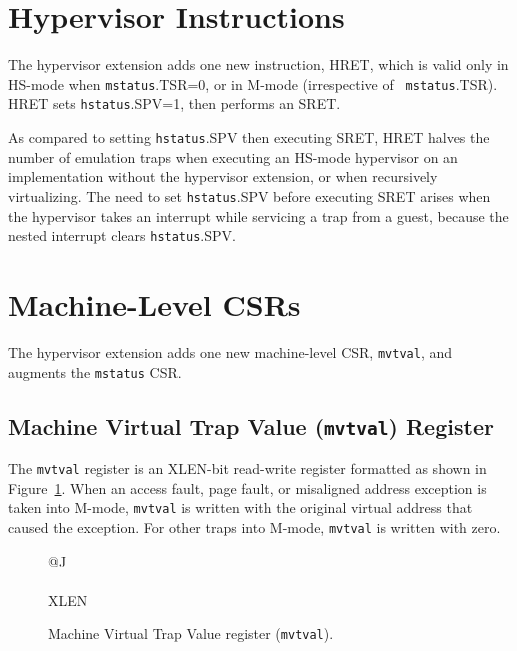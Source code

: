 \section{Hypervisor Instructions}

The hypervisor extension adds one new instruction, HRET, which is valid only
in HS-mode when {\tt mstatus}.TSR=0, or in M-mode (irrespective of {\tt
mstatus}.TSR).  HRET sets {\tt hstatus}.SPV=1, then performs an SRET.

\begin{commentary}
As compared to setting {\tt hstatus}.SPV then executing SRET, HRET halves the
number of emulation traps when executing an HS-mode hypervisor on an
implementation without the hypervisor extension, or when recursively
virtualizing.  The need to set {\tt hstatus}.SPV before executing SRET arises
when the hypervisor takes an interrupt while servicing a trap from a guest,
because the nested interrupt clears {\tt hstatus}.SPV.
\end{commentary}

\section{Machine-Level CSRs}

The hypervisor extension adds one new machine-level CSR, {\tt mvtval}, and
augments the {\tt mstatus} CSR.

\subsection{Machine Virtual Trap Value ({\tt mvtval}) Register}

The {\tt mvtval} register is an XLEN-bit read-write register formatted as shown
in Figure~\ref{mvtvalreg}.  When an access fault, page fault, or misaligned
address exception is taken into M-mode, {\tt mvtval} is
written with the original virtual address that caused the exception.
For other traps into M-mode, {\tt mvtval} is written with zero.

\begin{figure}[h!]
{\footnotesize
\begin{center}
\begin{tabular}{@{}J}
 \\
\hline
{} \\
\hline
XLEN \\
\end{tabular}
\end{center}
}
\vspace{-0.1in}
\caption{Machine Virtual Trap Value register ({\tt mvtval}).}
\label{mvtvalreg}
\end{figure}


